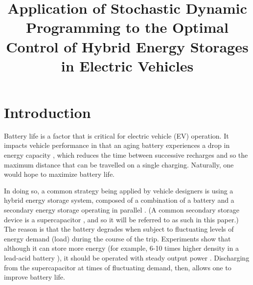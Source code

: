 \documentclass[conference]{IEEEtran}
\begin{document}
\title{Application of Stochastic Dynamic Programming to the Optimal Control of Hybrid Energy Storages in Electric Vehicles}

\author{
}


\maketitle


\section{Introduction}
Battery life is a factor that is critical for electric vehicle (EV) operation. It impacts vehicle performance in that an aging battery experiences a drop in energy capacity \cite{shi2017optimal}, which reduces the time between successive recharges and so the maximum distance that can be travelled on a single charging. Naturally, one would hope to maximize battery life.

In doing so, a common strategy being applied by vehicle designers is using a hybrid energy storage system, composed of a combination of a battery and a secondary energy storage operating in parallel \cite{thounthong2009energy}. (A common secondary storage device is a supercapacitor \cite{bambang2014energy}\cite{thounthong2009energy}\cite{7939849}, and so it will be referred to as such in this paper.) The reason is that the battery degrades when subject to fluctuating levels of energy demand (load) during the course of the trip. Experiments show that although it can store more energy (for example, 6-10 times higher density in a lead-acid battery \cite{bambang2014energy}), it should be operated with steady output power \cite{thounthong2009energy}. Discharging from the supercapacitor at times of fluctuating demand, then, allows one to improve battery life.
\end{document}
